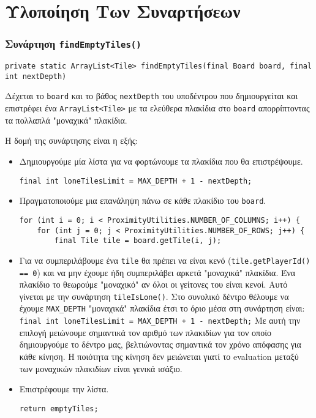 \chapter{Υλοποίηση Των Συναρτήσεων}
\subsection{Συνάρτηση \texttt{findEmptyTiles()}}\label{fun:findEmptyTiles}
\begin{lstlisting}[title={Declaration της συνάρτησης}]
private static ArrayList<Tile> findEmptyTiles(final Board board, final int nextDepth)
\end{lstlisting}
Δέχεται το \lstinline!board! και το βάθος \lstinline!nextDepth! του υποδέντρου που δημιουργείται και επιστρέφει ένα
\lstinline!ArrayList<Tile>! με τα ελεύθερα πλακίδια στο \lstinline!board! απορρίπτοντας τα πολλαπλά "μοναχικά" πλακίδια.

Η δομή της συνάρτησης είναι η εξής:
\begin{itemize}
\item Δημιουργούμε μία λίστα για να φορτώνουμε τα πλακίδια που θα επιστρέψουμε.
\begin{lstlisting}[style=chunk]
final int loneTilesLimit = MAX_DEPTH + 1 - nextDepth;
\end{lstlisting}

\item Πραγματοποιούμε μια επανάληψη πάνω σε κάθε πλακίδιο του \lstinline!board!.
\begin{lstlisting}[style=chunk]
for (int i = 0; i < ProximityUtilities.NUMBER_OF_COLUMNS; i++) {
    for (int j = 0; j < ProximityUtilities.NUMBER_OF_ROWS; j++) {
        final Tile tile = board.getTile(i, j);
\end{lstlisting}

\item Για να συμπεριλάβουμε ένα \lstinline!tile! θα πρέπει να είναι κενό
(\lstinline!tile.getPlayerId() == 0!)
και να μην έχουμε ήδη συμπεριλάβει αρκετά "μοναχικά" πλακίδια.
Ένα πλακίδιο το θεωρούμε "μοναχικό" αν όλοι οι γείτονες του είναι κενοί.
Αυτό γίνεται με την συνάρτηση \lstinline!tileIsLone()!.
Στο συνολικό δέντρο θέλουμε να έχουμε \lstinline!MAX_DEPTH! "μοναχικά" πλακίδια έτσι το όριο μέσα στη συνάρτηση είναι:
\lstinline!final int loneTilesLimit = MAX_DEPTH + 1 - nextDepth;!
Με αυτή την επιλογή μειώνουμε σημαντικά τον αριθμό των πλακιδίων για τον οποίο δημιουργούμε το δέντρο μας,
βελτιώνοντας σημαντικά τον χρόνο απόφασης για κάθε κίνηση.
Η ποιότητα της κίνηση δεν μειώνεται γιατί το evaluation μεταξύ των μοναχικών πλακιδίων είναι γενικά ισάξιο.

\item Επιστρέφουμε την λίστα.
\begin{lstlisting}[style=chunk]
return emptyTiles;
\end{lstlisting}
\end{itemize}


